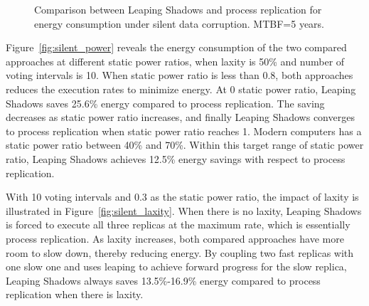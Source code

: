 {\begin{figure}[!t]
\begin{center}
{		}
	\end{center}
	\caption{Comparison between Leaping Shadows and process replication for energy consumption under silent data corruption. MTBF=5 years.}
	\label{fig:silent_eval}
\end{figure}

\clearpage
}

Figure~\ref{fig:silent_power} reveals the energy consumption of the two compared approaches at different static power ratios, when laxity is 50\% and number of voting intervals is 10. When static power ratio is less than 0.8, both approaches reduces the execution rates to minimize energy. At 0 static power ratio, Leaping Shadows saves 25.6\% energy compared to process replication. The saving decreases as static power ratio increases, and finally Leaping Shadows converges to process replication when static power ratio reaches 1. Modern computers has a static power ratio between 40\% and 70\%. Within this target range of static power ratio, Leaping Shadows achieves 12.5\% energy savings with respect to process replication.

With 10 voting intervals and 0.3 as the static power ratio, the impact of laxity is illustrated in Figure~\ref{fig:silent_laxity}. When there is no laxity, Leaping Shadows is forced to execute all three replicas at the maximum rate, which is essentially process replication. As laxity increases, both compared approaches have more room to slow down, thereby reducing energy. By coupling two fast replicas with one slow one and uses leaping to achieve forward progress for the slow replica, Leaping Shadows always saves 13.5\%-16.9\% energy compared to process replication when there is laxity.

